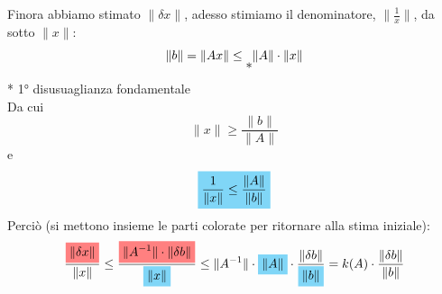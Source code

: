 Finora abbiamo stimato $\lVert \delta x \rVert$, adesso stimiamo il denominatore, $\lVert \frac{1}{x} \rVert$, da sotto $\lVert x \rVert$:\\
\begin{displaymath}
    \lVert b \rVert=\lVert Ax \rVert \leq \raisebox{-10pt}{*} \lVert A \rVert \cdot \lVert x \rVert
\end{displaymath}
* 1° disusuaglianza fondamentale\\
Da cui
\begin{displaymath}
    \lVert x \rVert \geq \frac{\lVert b \rVert}{\lVert A \rVert}
\end{displaymath}
e
\begin{displaymath}
    \highlightCYAN{\frac{1}{\lVert x \rVert} \leq \frac{\lVert A \rVert}{\lVert b \rVert}}
\end{displaymath}
Perciò (si mettono insieme le parti colorate per ritornare alla stima iniziale):
\begin{displaymath}
    \frac{\highlightRED{\lVert \delta x \rVert }}{\lVert x \rVert } \leq \frac{\highlightRED{\lVert A^{-1} \rVert \cdot \lVert \delta b \rVert }}{\highlightCYAN{\lVert x \rVert }} \leq \lVert A^{-1} \rVert  \cdot \highlightCYAN{\lVert A \rVert} \cdot \frac{\lVert \delta b \rVert }{\highlightCYAN{\lVert b \rVert }} = k(A)\cdot \frac{\lVert \delta b \rVert }{\lVert b \rVert }
\end{displaymath}